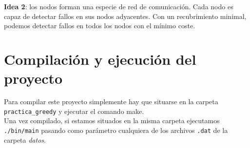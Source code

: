 \documentclass[11pt]{article}
\begin{document}
\textbf{Idea 2}: los nodos forman una especie de red de comunicación. Cada nodo es capaz de detectar fallos en sus nodos adyacentes. Con un recubrimiento minimal, podemos detectar fallos en todos los nodos con el mínimo coste.


\section*{Compilación y ejecución del proyecto}
Para compilar este proyecto simplemente hay que situarse en la carpeta \verb|practica_greedy| y ejecutar el comando make.\\

Una vez compilado, si estamos situados en la misma carpeta ejecutamos \verb|./bin/main| pasando como parámetro cualquiera de los archivos \verb|.dat| de la carpeta \textit{datos}.
\end{document}
